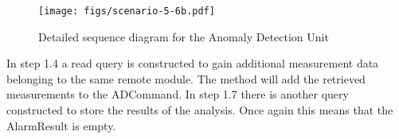 \begin{figure}[H]
	\begin{centering}
		\texttt{[image: figs/scenario-5-6b.pdf]}
		\caption{Detailed sequence diagram for the Anomaly Detection Unit}
		\label{fig:scenario-5-6c}
	\end{centering}
\end{figure}

\npar In step 1.4 a read query is constructed to gain additional measurement
data belonging to the same remote module. The  method
will add the retrieved measurements to the ADCommand. In step 1.7 there is
another query constructed to store the results of the analysis. Once again this
means that the AlarmResult is empty.



